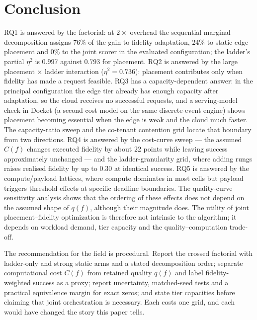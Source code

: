 \documentclass[journal,10pt]{IEEEtran}
\begin{document}
\section{Conclusion}
\label{sec:concl}

RQ1 is answered by the factorial: at $2\times$ overhead the sequential marginal
decomposition assigns $76\%$ of the gain to fidelity adaptation, $24\%$ to static
edge placement and $0\%$ to the joint scorer in the evaluated configuration; the
ladder's partial $\eta^2$ is $0.997$ against $0.793$ for placement. RQ2 is
answered by the large placement $\times$ ladder interaction ($\eta^2=0.736$):
placement contributes only when fidelity has made a request feasible. RQ3 has a
capacity-dependent answer: in the principal configuration the edge tier already
has enough capacity after adaptation, so the cloud receives no successful
requests, and a serving-model check in Docket (a second cost model on the same
discrete-event engine) shows placement becoming essential when the edge is weak
and the cloud much faster. The capacity-ratio sweep and the co-tenant contention
grid locate that boundary from two directions. RQ4 is answered by the
cost-curve sweep --- the assumed $C(f)$ changes executed fidelity by about $22$
points while leaving success approximately unchanged --- and the ladder-granularity
grid, where adding rungs raises realised fidelity by up to $0.30$ at identical
success. RQ5 is answered by the compute/payload lattices, where compute dominates
in most cells but payload triggers threshold effects at specific deadline
boundaries. The quality-curve sensitivity analysis shows that the ordering of
these effects does not depend on the assumed shape of $q(f)$, although their
magnitude does. The utility of joint placement--fidelity optimization is therefore
not intrinsic to the algorithm; it depends on workload demand, tier capacity and
the quality--computation trade-off.

The recommendation for the field is procedural. Report the crossed factorial
with ladder-only and strong static arms and a stated decomposition order;
separate computational cost $C(f)$ from retained quality $q(f)$ and label
fidelity-weighted success as a proxy; report uncertainty, matched-seed tests and
a practical equivalence margin for exact zeros; and state tier capacities before
claiming that joint orchestration is necessary. Each costs one grid, and each
would have changed the story this paper tells.

\balance


\end{document}
